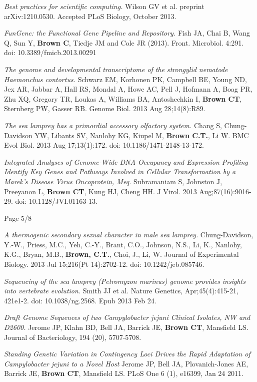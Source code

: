 \documentclass[margin,line]{resume}
\begin{document}
\begin{resume}
{\em Best practices for scientific computing.} Wilson GV et al. preprint arXiv:1210.0530. Accepted PLoS Biology, October 2013.

{\em FunGene: the Functional Gene Pipeline and Repository.} Fish JA, Chai B, Wang Q, Sun Y, {\bf Brown C}, Tiedje JM and Cole JR (2013).  Front. Microbiol. 4:291. doi: 10.3389/fmicb.2013.00291

{\em The genome and developmental transcriptome of the strongylid
  nematode Haemonchus contortus.}  Schwarz EM, Korhonen PK, Campbell
BE, Young ND, Jex AR, Jabbar A, Hall RS, Mondal A, Howe AC, Pell J,
Hofmann A, Boag PR, Zhu XQ, Gregory TR, Loukas A, Williams BA,
Antoshechkin I, {\bf Brown CT}, Sternberg PW, Gasser RB.  Genome
Biol. 2013 Aug 28;14(8):R89.

{\em The sea lamprey has a primordial accessory olfactory system.}
Chang S, Chung-Davidson YW, Libants SV, Nanlohy KG, Kiupel M, {\bf
  Brown C.T.}, Li W. BMC Evol Biol. 2013 Aug 17;13(1):172. doi:
10.1186/1471-2148-13-172.

{\em Integrated Analyses of Genome-Wide DNA Occupancy and Expression
  Profiling Identify Key Genes and Pathways Involved in Cellular
  Transformation by a Marek's Disease Virus Oncoprotein, Meq.}
Subramaniam S, Johnston J, Preeyanon L, {\bf Brown CT}, Kung HJ, Cheng
HH. J Virol. 2013 Aug;87(16):9016-29. doi: 10.1128/JVI.01163-13.

\vspace{1cm}
{\centerline {Page 5/8}}

\newpage

{\em A thermogenic secondary sexual character in male sea lamprey.}
Chung-Davidson, Y.-W., Priess, M.C., Yeh, C.-Y., Brant, C.O., Johnson,
N.S., Li, K., Nanlohy, K.G., Bryan, M.B., {\bf Brown, C.T.}, Choi, J.,
Li, W. Journal of Experimental Biology. 2013 Jul 15;216(Pt
14):2702-12. doi: 10.1242/jeb.085746.

{\em Sequencing of the sea lamprey (Petromyzon marinus) genome provides insights into vertebrate evolution.} Smith JJ et al. Nature Genetics, Apr;45(4):415-21, 421e1-2. doi: 10.1038/ng.2568. Epub 2013 Feb 24.

{\em Draft Genome Sequences of two Campylobacter jejuni Clinical Isolates,
NW and D2600.} Jerome JP, Klahn BD, Bell JA, Barrick JE, {\bf Brown CT}, Mansfield LS. Journal of Bacteriology, 194 (20), 5707-5708.

{\em Standing Genetic Variation in Contingency Loci Drives the Rapid
  Adaptation of Campylobacter jejuni to a Novel Host} Jerome JP, Bell
JA, Plovanich-Jones AE, Barrick JE, {\bf Brown CT}, Mansfield LS.  PLoS One 6
(1), e16399, Jan 24 2011.


\end{resume}
\end{document}
